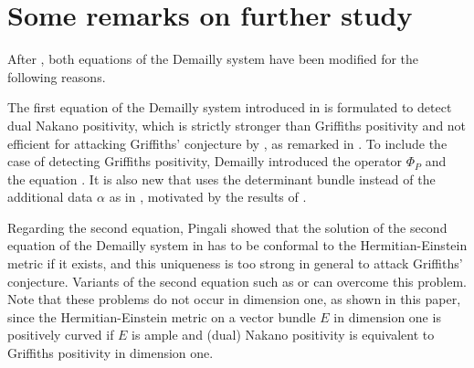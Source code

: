 \documentclass[a4, 12pt, 
]{amsart}
\numberwithin{equation}{section}
\theoremstyle{plain}
\theoremstyle{definition}
\theoremstyle{remark}
\begin{document}
\section{Some remarks on further study}\label{sec: rem}

After \cite{Dem21}, both equations of the Demailly system have been modified for the following reasons. 

The first equation of the Demailly system introduced in \cite{Dem21} is formulated to detect dual Nakano positivity, which is strictly stronger than Griffiths positivity and not efficient for attacking Griffiths' conjecture by \cite{LSY}, as remarked in \cite[Section 1]{Dem22}. To include the case of detecting Griffiths positivity, Demailly introduced the operator $\Phi_P$ \cite[equations (2.1), (2.2), (2.3), and (2.17)]{Dem22} and the equation \cite[equation (3.24)]{Dem22}. It is also new that \cite[equation (3.24)]{Dem22} uses the determinant bundle instead of the additional data $\alpha$ as in \cite{Dem21}, motivated by the results of \cite{Ber, LSY, MT}.

Regarding the second equation, Pingali \cite{Pin21} showed that the solution of the second equation of the Demailly system in \cite[Theorem 2.17]{Dem21} has to be conformal to the Hermitian-Einstein metric if it exists, and this uniqueness is too strong in general to attack Griffiths' conjecture. Variants of the second equation
such as \cite[Section 2.19]{Dem21} or \cite[equation (3.24$^\circ$)]{Dem22} can overcome this problem.
Note that these problems do not occur in dimension one, as shown in this paper, since the Hermitian-Einstein metric on a vector bundle $E$ in dimension one is positively curved if $E$ is ample and (dual) Nakano positivity is equivalent to Griffiths positivity in dimension one. 
\end{document}
